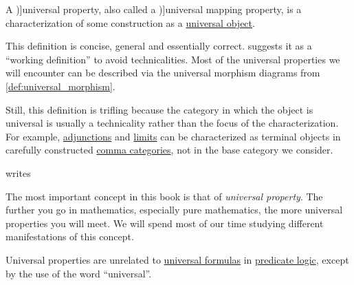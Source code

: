 \begin{concept}\label{con:universal_property}
  A \term[en=universal property (\cite[33]{Aluffi2009Algebra})]{universal property}, also called a \term[en=universal mapping property (\cite[19]{Awodey2010CategoryTheory})]{universal mapping property}, is a characterization of some construction as a \hyperref[def:universal_objects/universal]{universal object}.
\end{concept}
\begin{comments}
  \item This definition is concise, general and essentially correct. \Textcite[35]{Aluffi2009Algebra} suggests it as a \enquote{working definition} to avoid technicalities. Most of the universal properties we will encounter can be described via the universal morphism diagrams from \cref{def:universal_morphism}.

  Still, this definition is trifling because the category in which the object is universal is usually a technicality rather than the focus of the characterization. For example, \hyperref[def:unit_counit_adjunction]{adjunctions} and \hyperref[def:categorical_limit]{limits} can be characterized as terminal objects in carefully constructed \hyperref[def:comma_category]{comma categories}, not in the base category we consider.

  \Textcite[1]{Leinster2014BasicCategoryTheory} writes
  \begin{displayquote}
    The most important concept in this book is that of \textit{universal property}. The further you go in mathematics, especially pure mathematics, the more universal properties you will meet. We will spend most of our time studying different manifestations of this concept.
  \end{displayquote}

  \item Universal properties are unrelated to \hyperref[def:fol_prenex_normal_form/universal]{universal formulas} in \hyperref[con:predicate_logic]{predicate logic}, except by the use of the word \enquote{universal}.
\end{comments}

